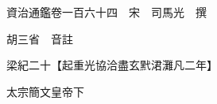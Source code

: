 










 


 
 


 

  
  
  
  
  





  
  
  
  
  
 
  

  

  
  
  



  

 
 

  
   




  

  
  


  　　資治通鑑卷一百六十四　宋　司馬光　撰

　　胡三省　音註

　　梁紀二十【起重光協洽盡玄黓涒灘凡二年】

　　太宗簡文皇帝下

